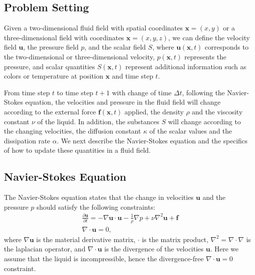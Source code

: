 \documentclass[sigconf]{acmart}
\begin{document}
\subsection{Problem Setting}
Given a two-dimensional fluid field with spatial coordinates $\mathbf{x} = (x, y)$ or a three-dimensional field with coordinates $\mathbf{x} = (x, y, z)$, we can define the velocity field $\mathbf{u}$, the pressure field $p$, and the scalar field $S$, where $\mathbf{u}(\mathbf{x}, t)$ corresponds to the two-dimensional or three-dimensional velocity, $p(\mathbf{x}, t)$ represents the pressure, and scalar quantities $S(\mathbf{x}, t)$ represent additional information such as colors or temperature at position $\mathbf{x}$ and time step $t$.

From time step $t$ to time step $t + 1$ with change of time $\Delta t$, following the Navier-Stokes equation, the velocities and pressure in the fluid field will change according to the external force $\mathbf{f}(\mathbf{x}, t)$ applied, the density $\rho$ and the viscosity constant $\nu$ of the liquid. In addition, the substances $S$ will change according to the changing velocities, the diffusion constant $\kappa$ of the scalar values and the dissipation rate $\alpha$. We next describe the Navier-Stokes equation and the specifics of how to update these quantities in a fluid field.

\subsection{Navier-Stokes Equation}
The Navier-Stokes equation states that the change in velocities $\mathbf{u}$ and the pressure $p$ should satisfy the following constraints:
\begin{equation}
\label{eq:stokes}
\begin{split}
  &\frac{\partial \mathbf{u}}{\partial t} = -\nabla\mathbf{u} \cdot \mathbf{u} - \frac{1}{\rho}\nabla p + \nu\nabla^2\mathbf{u} + \mathbf{f}\\
  &\nabla\cdot\mathbf{u} = 0,
\end{split}
\end{equation}
where $\nabla\mathbf{u}$ is the material derivative matrix, $\cdot$ is the matrix product, $\nabla^2 = \nabla\cdot\nabla$ is the laplacian operator, and $\nabla\cdot\mathbf{u}$ is the divergence of the velocities $\mathbf{u}$. Here we assume that the liquid is incompressible, hence the divergence-free $\nabla\cdot\mathbf{u} = 0$ constraint.
\end{document}
